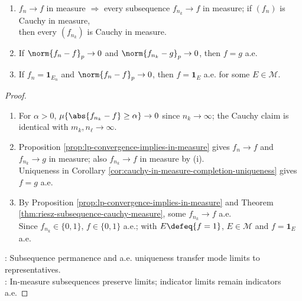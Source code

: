 \begin{proposition} \label{prop:subsequence-and-indicator-exercise-consequences} 
\begin{enumerate}[label=(\roman*)]
\setlength{\itemsep}{0pt}
\item $f_n\to f$ in measure $\Rightarrow$ every subsequence $f_{n_k}\to f$ in measure; if $(f_n)$ is Cauchy in measure,\\
then every $(f_{n_k})$ is Cauchy in measure.
\item If $\norm{f_n-f}_p\to0$ and $\norm{f_{n_k}-g}_p\to0$, then $f=g$ a.e.
\item If $f_n=\mathbf{1}_{E_n}$ and $\norm{f_n-f}_p\to0$, then $f=\mathbf{1}_E$ a.e. for some $E\in\mathcal{M}$.
\end{enumerate}
\begin{proof}
\begin{enumerate}[label=(\roman*)]
\setlength{\itemsep}{0pt}
\item For $\alpha>0$, $\mu\{\abs{f_{n_k}-f}\geq\alpha\}\to0$ since $n_k\to\infty$; the Cauchy claim is identical with $m_k,n_\ell\to\infty$.
\item Proposition \ref{prop:lp-convergence-implies-in-measure} gives $f_n\to f$ and $f_{n_k}\to g$ in measure; also $f_{n_k}\to f$ in measure by (i).\\
Uniqueness in Corollary \ref{cor:cauchy-in-measure-completion-uniqueness} gives $f=g$ a.e.
\item By Proposition \ref{prop:lp-convergence-implies-in-measure} and Theorem \ref{thm:riesz-subsequence-cauchy-measure}, some $f_{n_k}\to f$ a.e.\\
Since $f_{n_k}\in\{0,1\}$, $f\in\{0,1\}$ a.e.; with $E\defeq\{f=1\}$, $E\in\mathcal{M}$ and $f=\mathbf{1}_E$ a.e.
\end{enumerate}
: Subsequence permanence and a.e. uniqueness transfer mode limits to representatives.\\
: In-measure subsequences preserve limits; indicator limits remain indicators a.e.
\end{proof}
\end{proposition}

